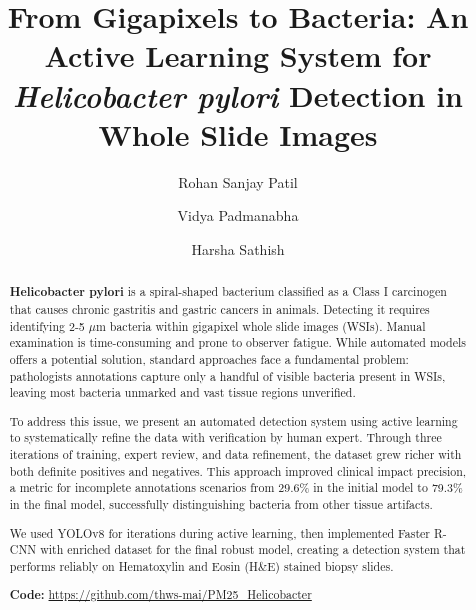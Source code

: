\documentclass[sigconf, review, nonacm]{acmart}
\begin{document}
\title[H. pylori Detection via Active Learning]{From Gigapixels to Bacteria: An Active Learning System for \textit{Helicobacter pylori} Detection in Whole Slide Images}


\author{Rohan Sanjay Patil}

\author{Vidya Padmanabha}

\author{Harsha Sathish}
\renewcommand{\shortauthors}{ Patil, Padmanabha, Sathish}

\begin{abstract}
\textbf{Helicobacter pylori} is a spiral-shaped bacterium classified as a Class I carcinogen that causes chronic gastritis and gastric cancers in animals. Detecting it requires identifying 2-5 $\mu$m bacteria within gigapixel whole slide images (WSIs). Manual examination is time-consuming and prone to observer fatigue. While automated models offers a potential solution, standard approaches face a fundamental problem: pathologists annotations capture only a handful of visible bacteria present in WSIs, leaving most bacteria unmarked and vast tissue regions unverified.

To address this issue, we present an automated detection system using active learning to systematically refine the data with verification by human expert. Through three iterations of training, expert review, and data refinement, the dataset grew richer with both definite positives and  negatives. This approach improved clinical impact precision, a metric for incomplete annotations scenarios from 29.6\% in the initial model to 79.3\% in the final model, successfully distinguishing bacteria from other tissue artifacts.

We used YOLOv8 for iterations during active learning, then implemented Faster R-CNN with enriched dataset for the final robust model, creating a detection system that performs reliably on Hematoxylin and Eosin (H\&E) stained biopsy slides.


\textbf{Code:} \url{https://github.com/thws-mai/PM25_Helicobacter}
\end{abstract}
\maketitle
\end{document}
